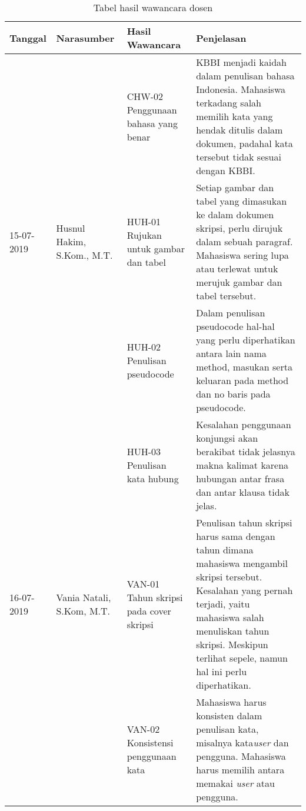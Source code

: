 \begin{table}[H]
	\renewcommand{\arraystretch}{1.5}
	\caption {Tabel hasil wawancara dosen} \label{tab:hasil_wawancara2}
	\begin{center}
		\begin{tabular}{|p{2 cm}|>{\raggedright} p{3.5 cm}| p{4 cm}| p{5 cm}|}
		\hline
		Tanggal & Narasumber & Hasil Wawancara & Penjelasan \\ 
		\hline
		 & & CHW-02 \newline Penggunaan bahasa yang benar & KBBI menjadi kaidah dalam penulisan bahasa Indonesia. Mahasiswa terkadang salah memilih kata yang hendak ditulis dalam dokumen, padahal kata tersebut tidak sesuai dengan KBBI. \newline \\ 		
		\hline
		15-07-2019 & Husnul Hakim, S.Kom., M.T. & HUH-01 \newline Rujukan untuk gambar dan tabel & Setiap gambar dan tabel yang dimasukan ke dalam dokumen skripsi, perlu dirujuk dalam sebuah paragraf. Mahasiswa sering lupa atau terlewat untuk merujuk gambar dan tabel tersebut. \newline \\ 
		\hline
		 & & HUH-02 \newline Penulisan pseudocode & Dalam penulisan pseudocode hal-hal yang perlu diperhatikan antara lain nama method, masukan serta keluaran pada method dan no baris pada pseudocode.	 \newline \\ 
		\hline
		 & & HUH-03 \newline Penulisan kata hubung & Kesalahan penggunaan konjungsi akan berakibat tidak jelasnya makna kalimat karena hubungan antar frasa dan antar klausa tidak jelas. \newline \\ 
		\hline
		16-07-2019 & Vania Natali, S.Kom, M.T. & VAN-01 \newline Tahun skripsi pada cover skripsi & Penulisan tahun skripsi harus sama dengan tahun dimana mahasiswa mengambil skripsi tersebut. Kesalahan yang pernah terjadi, yaitu mahasiswa salah menuliskan tahun skripsi. Meskipun terlihat sepele, namun hal ini perlu diperhatikan.			 \newline \\ 
		\hline
		 & & VAN-02 \newline Konsistensi penggunaan kata & Mahasiswa harus konsisten dalam penulisan kata, misalnya kata\textit{user} dan pengguna.  Mahasiswa harus memilih antara memakai \textit{user} atau pengguna. \newline \\ 
		\hline
		\end{tabular}
	\end{center}
\end{table}

